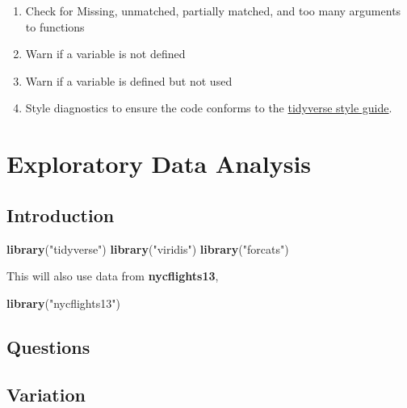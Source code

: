 \documentclass[]{book}
\newenvironment{Shaded}{\begin{snugshade}}{\end{snugshade}}
\newcommand{\KeywordTok}[1]{\textcolor[rgb]{0.13,0.29,0.53}{\textbf{#1}}}
\newcommand{\NormalTok}[1]{#1}
\newcommand{\StringTok}[1]{\textcolor[rgb]{0.31,0.60,0.02}{#1}}
\providecommand{\tightlist}{%
  \setlength{\itemsep}{0pt}\setlength{\parskip}{0pt}}
\theoremstyle{plain}
\theoremstyle{remark}
\begin{document}
\begin{enumerate}
\def\labelenumi{\arabic{enumi}.}
\tightlist
\item
  Check for Missing, unmatched, partially matched, and too many arguments to functions
\item
  Warn if a variable is not defined
\item
  Warn if a variable is defined but not used
\item
  Style diagnostics to ensure the code conforms to the \href{http://adv-r.had.co.nz/Style.html}{tidyverse style guide}.
\end{enumerate}

\hypertarget{exploratory-data-analysis}{%
\chapter{Exploratory Data Analysis}\label{exploratory-data-analysis}}

\hypertarget{introduction-3}{%
\section{Introduction}\label{introduction-3}}

\begin{Shaded}
\begin{Highlighting}[]
\KeywordTok{library}\NormalTok{(}\StringTok{"tidyverse"}\NormalTok{)}
\KeywordTok{library}\NormalTok{(}\StringTok{"viridis"}\NormalTok{)}
\KeywordTok{library}\NormalTok{(}\StringTok{"forcats"}\NormalTok{)}
\end{Highlighting}
\end{Shaded}

This will also use data from \textbf{nycflights13},

\begin{Shaded}
\begin{Highlighting}[]
\KeywordTok{library}\NormalTok{(}\StringTok{"nycflights13"}\NormalTok{)}
\end{Highlighting}
\end{Shaded}

\hypertarget{questions}{%
\section{Questions}\label{questions}}

\hypertarget{variation}{%
\section{Variation}\label{variation}}
\end{document}
